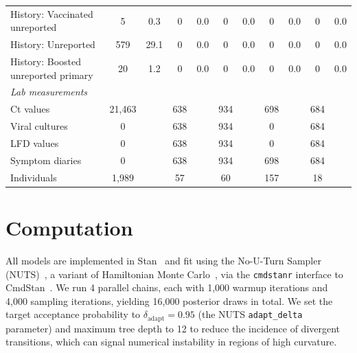 \documentclass[12pt]{article}
\begin{document}
\begin{landscape}
\begin{table}[p]
\begin{tabular}{lcccccccccc}
     History: Vaccinated unreported & 5 & 0.3 & 0 & 0.0 & 0 & 0.0 & 0 & 0.0 & 0 & 0.0\\
     History: Unreported & 579 & 29.1 & 0 & 0.0 & 0 & 0.0 & 0 & 0.0 & 0 & 0.0\\
     History: Boosted unreported primary & 20 & 1.2 & 0 &0.0 & 0 & 0.0 & 0 & 0.0 & 0 & 0.0\\
     \midrule
     \textit{Lab measurements} &  &  &  &  &  &  &  &  &  &  \\
        Ct values & 21,463 & & 638 & & 934 & & 698 & & 684 \\
        Viral cultures & 0 & & 638 & & 934 & & 0 & & 684 \\
        LFD values & 0 & & 638 & & 934 & & 0 & & 684 \\
        Symptom diaries & 0 & & 638 & & 934 & & 698 & & 684 \\
     \midrule
     Individuals & 1,989 &  & 57 & & 60 & & 157 & & 18 \\
     \bottomrule
     \end{tabular}
    \label{tab:cohorts}
\end{table}
\end{landscape}


\section{Computation} \label{sec:computation}
All models are implemented in Stan~\cite{carpenter2017stan} and fit using the No-U-Turn Sampler (NUTS)~\cite{hoffman2014no}, a variant of Hamiltonian Monte Carlo~\cite{betancourt2017conceptual}, via the \texttt{cmdstanr} interface to CmdStan~\cite{gabry2024cmdstanr}. We run 4 parallel chains, each with 1{,}000 warmup iterations and 4{,}000 sampling iterations, yielding 16{,}000 posterior draws in total. We set the target acceptance probability to $\delta_{\text{adapt}} = 0.95$ (the NUTS \texttt{adapt\_delta} parameter) and maximum tree depth to 12 to reduce the incidence of divergent transitions, which can signal numerical instability in regions of high curvature. 
\end{document}

